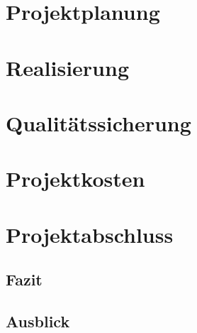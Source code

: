 \documentclass[11pt,a4paper,titlepage=firstiscover]{scrartcl} %
\begin{document}
\newpage
\section{Projektplanung}
\section{Realisierung}
\section{Qualit\"atssicherung}
\section{Projektkosten}
\section{Projektabschluss}
\subsection{Fazit}
\subsection{Ausblick}


%
%
\end{document}
